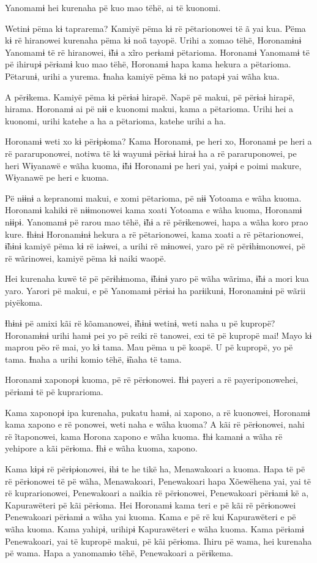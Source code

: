 Yanomamɨ hei kurenaha pë kuo mao tëhë, ai të kuonomi. 

Wetinɨ pëma kɨ taprarema? Kamiyë pëma kɨ rë pëtarionowei të ã yai kua.
Pëma kɨ rë hiranowei kurenaha pëma kɨ noã tayopë. Urihi a xomao tëhë,
Horonamɨnɨ Yanomamɨ të rë hiranowei, ɨ̃hɨ a xĩro perɨamɨ pëtarioma.
Horonamɨ Yanomamɨ të pë ihirupɨ përɨamɨ kuo mao tëhë, Horonamɨ hapa kama
hekura a pëtarioma. Pëtarunɨ, urihi a yurema. Ɨnaha kamiyë pëma kɨ no
patapɨ yai wãha kua. 

A përɨkema. Kamiyë pëma kɨ përɨaɨ hirapë. Napë pë makui, pë përɨaɨ
hirapë, hirama. Horonamɨ ai pë nɨɨ e kuonomi makui, kama a pëtarioma.
Urihi hei a kuonomi, urihi katehe a ha a pëtarioma, katehe urihi a ha. 

Horonamɨ weti xo kɨ përɨpɨoma? Kama Horonamɨ, pe heri xo, Horonamɨ pe
heri a rë pararuponowei, notiwa të kɨ wayumɨ përɨaɨ hiraɨ ha a rë
pararuponowei, pe heri Wɨyanawë e wãha kuoma, ɨ̃hɨ Horonamɨ pe heri yai,
yaɨpɨ e poimi makure, Wɨyanawë pe heri e kuoma. 

Pë nɨɨnɨ a kepranomi makui, e xomi pëtarioma, pë nɨɨ Yotoama e wãha
kuoma. Horonamɨ kahikɨ rë nɨɨmonowei kama xoati Yotoama e wãha kuoma,
Horonamɨ nɨɨpɨ. Yanomamɨ pë rarou mao tëhë, ɨ̃hɨ a rë përɨkenowei, hapa a
wãha koro prao kure. Ɨhɨnɨ Horonamɨnɨ hekura a rë pëtarionowei, kama
xoati a rë pëtarionowei, ɨ̃hɨnɨ kamiyë pëma kɨ rë iaɨwei, a urihi rë
mɨnowei, yaro pë rë përɨhɨmonowei, pë rë wãrinowei, kamiyë pëma kɨ naiki
waopë. 

Hei kurenaha kuwë të pë përɨhɨmoma, ɨ̃hɨnɨ yaro pë wãha wãrima, ɨ̃hɨ a
mori kua yaro. Yarori pë makui, e pë Yanomamɨ përɨaɨ ha parɨikunɨ,
Horonamɨnɨ pë wãrii piyëkoma. 

Ɨhɨnɨ pë amixi kãi rë kõamanowei, ɨ̃hɨnɨ wetinɨ, weti naha u pë kupropë?
Horonamɨnɨ urihi hamɨ pei yo pë reiki rë tanowei, exi të pë kupropë mai!
Mayo kɨ maprou pëo rë mai, yo kɨ tama. Mau pëma u pë koapë. U pë
kupropë, yo pë tama. Ɨnaha a urihi komio tëhë, ɨ̃naha të tama. 

Horonamɨ xaponopɨ kuoma, pë rë përɨonowei. Ɨhɨ payeri a rë
payeriponowehei, përɨamɨ të pë kuprarioma. 

Kama xaponopɨ ipa kurenaha, pukatu hamɨ, ai xapono, a rë kuonowei,
Horonamɨ kama xapono e rë ponowei, weti naha e wãha kuoma? A kãi rë
përɨonowei, nahi rë ĩtaponowei, kama Horona xapono e wãha kuoma. Ɨhɨ
kamanɨ a wãha rë yehipore a kãi përɨoma. Ɨhɨ e wãha kuoma, xapono. 

Kama kɨpɨ rë përɨpɨonowei, ɨhɨ te he tikë ha, Menawakoari a kuoma. Hapa
të pë rë përɨonowei të pë wãha, Menawakoari, Penewakoari hapa Xõewëhena
yai, yai të rë kuprarionowei, Penewakoari a naikia rë përɨonowei,
Penewakoari përɨamɨ kë a, Kapurawëteri pë kãi përɨoma. Hei Horonamɨ kama
teri e pë kãi rë përɨonowei Penewakoari përɨamɨ a wãha yai kuoma. Kama e
pë rë kui Kapurawëteri e pë wãha kuoma. Kama yahipɨ, urihipɨ
Kapurawëteri e wãha kuoma. Kama përɨamɨ Penewakoari, yai të kupropë
makui, pë kãi përɨoma. Ihiru pë wama, hei kurenaha pë wama. Hapa a
yanomamɨo tëhë, Penewakoari a përɨkema. 

